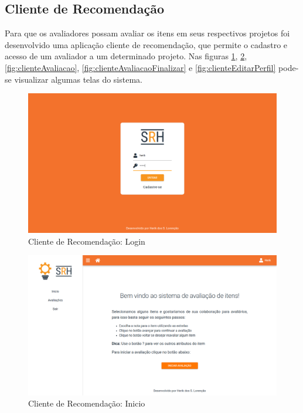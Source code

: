 \subsection{Cliente de Recomendação}

Para que os avaliadores possam avaliar os itens em seus respectivos projetos foi desenvolvido uma aplicação cliente de recomendação, que permite o cadastro e acesso de um avaliador a um determinado projeto. Nas figuras \ref{fig:clienteLogin}, \ref{fig:clienteInicio}, \ref{fig:clienteAvaliacao}, \ref{fig:clienteAvaliacaoFinalizar} e \ref{fig:clienteEditarPerfil} pode-se visualizar algumas telas do sistema.

\begin{figure}[H]
	\centering
	\includegraphics[width=.9\linewidth]{imagens/clientLogin.png}
	\caption[Cliente de Recomendação: Login]{Cliente de Recomendação: Login}
    \label{fig:clienteLogin}
\end{figure}

\begin{figure}[H]
	\centering
	\includegraphics[width=.9\linewidth]{imagens/clientInicio.png}
	\caption[Cliente de Recomendação: Inicio]{Cliente de Recomendação: Inicio}
    \label{fig:clienteInicio}
\end{figure}

